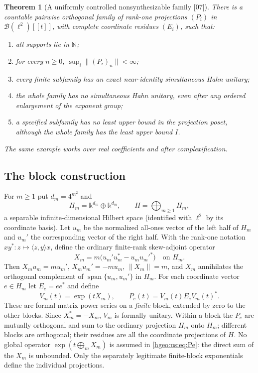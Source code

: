 \documentclass[11pt,letterpaper]{article}
\numberwithin{equation}{section}
\newtheorem{theorem}{Theorem}[section]
\theoremstyle{definition}
\theoremstyle{remark}
\newcommand{\N}{\mathbb N}
\newcommand{\kk}{\mathbb k}
\newcommand{\Span}{\operatorname{span}}
\newcommand{\ip}[2]{\langle #1,#2\rangle}
\newcommand{\norm}[1]{\lVert #1\rVert}
\newcommand{\src}[1]{\textup{\textsf{\small[#1]}}}
\begin{document}
\begin{theorem}[A uniformly controlled nonsynthesizable family \src{07}]
\label{hgeo:us:thm:uniform}
There is a countable pairwise orthogonal family of rank-one projections
$(P_i)$ in $\mathcal B(\ell^2)[[t]]$, with complete coordinate residues
$(E_i)$, such that:
\begin{enumerate}[label=\textup{(\roman*)}]
\item all supports lie in $\N$;
\item for every $n\ge0$, $\sup_i\norm{(P_i)_n}<\infty$;
\item every finite subfamily has an exact near-identity simultaneous Hahn
unitary;
\item the whole family has no simultaneous Hahn unitary, even after any
ordered enlargement of the exponent group;
\item a specified subfamily has no least upper bound in the projection poset,
although the whole family has the least upper bound $I$.
\end{enumerate}
The same example works over real coefficients and after complexification.
\end{theorem}

\subsection{The block construction}
For $m\ge1$ put $d_m=4^{m^2}$ and
\[
 H_m=\kk^{d_m}\oplus\kk^{d_m},\qquad H=\bigoplus_{m\ge1}H_m ,
\]
a separable infinite-dimensional Hilbert space (identified with $\ell^2$ by
its coordinate basis). Let $u_m$ be the normalized all-ones vector of the left
half of $H_m$ and $u_m'$ the corresponding vector of the right half. With the
rank-one notation $xy^*:z\mapsto\ip{z}{y}x$, define the ordinary finite-rank
skew-adjoint operator
\begin{equation}\label{hgeo:us:eq:Xm}
 X_m=m\bigl(u_m'u_m^*-u_mu_m'^*\bigr)\quad\text{on }H_m .
\end{equation}
Then $X_mu_m=mu_m'$, $X_mu_m'=-mu_m$, $\norm{X_m}=m$, and $X_m$ annihilates
the orthogonal complement of $\Span\{u_m,u_m'\}$ in $H_m$. For each
coordinate vector $e\in H_m$ let $E_e=ee^*$ and define
\begin{equation}\label{hgeo:us:eq:Pe}
 V_m(t)=\exp(tX_m),\qquad P_e(t)=V_m(t)E_eV_m(t)^* .
\end{equation}
These are formal matrix power series on a \emph{finite} block, extended by
zero to the other blocks. Since $X_m^*=-X_m$, $V_m$ is formally unitary. Within
a block the $P_e$ are mutually orthogonal and sum to the ordinary projection
$\Pi_m$ onto $H_m$; different blocks are orthogonal; their residues are all the
coordinate projections of $H$. No global operator $\exp(t\bigoplus_mX_m)$ is
assumed in \eqref{hgeo:us:eq:Pe}: the direct sum of the $X_m$ is unbounded.
Only the separately legitimate finite-block exponentials define the
individual projections.
\end{document}
